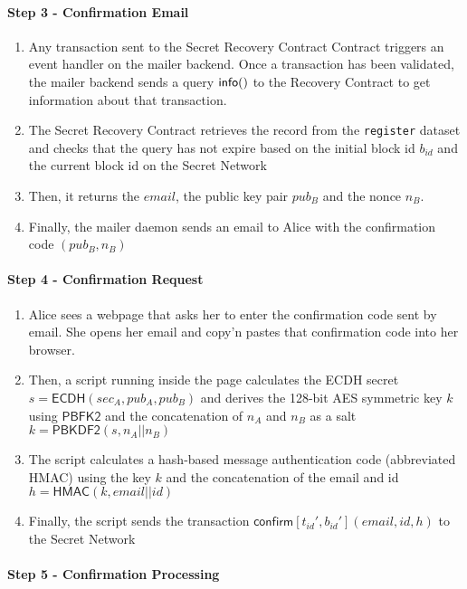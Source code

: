 \documentclass[12pt]{article}
\newcommand{\ms}[1]{\ensuremath{\mathsf{#1}}}
\newcommand{\tx}[3]{\ms{#1}[#2](#3)}
\newcommand{\qry}[3]{\ms{#1}(#3)}
\begin{document}
\paragraph{Step 3 - Confirmation Email}

\begin{enumerate}[label=3.\arabic*]
  \item Any transaction sent to the Secret Recovery Contract Contract triggers an event handler on the mailer backend. Once a transaction has been validated, the mailer backend sends a query $\qry{info}{t_id}$ to the Recovery Contract to get information about that transaction.
  \item The Secret Recovery Contract retrieves the record from the {\tt register} dataset and checks that the query has not expire based on the initial block id $b_{id}$ and the current block id on the Secret Network
  \item Then, it returns the $email$, the public key pair $pub_B$ and the nonce $n_B$.
  \item Finally, the mailer daemon sends an email to Alice with the confirmation code $(pub_B, n_B)$
\end{enumerate}

\paragraph{Step 4 - Confirmation Request}

\begin{enumerate}[label=4.\arabic*]
  \item Alice sees a webpage that asks her to enter the confirmation code sent by email. She opens her email and copy'n pastes that confirmation code into her browser. 
  \item Then, a script running inside the page calculates the ECDH secret $s=\ms{ECDH}(sec_A, pub_A, pub_B)$ and derives the 128-bit AES symmetric key $k$ using $\ms{PBFK2}$ and the concatenation of $n_A$ and $n_B$ as a salt $k=\ms{PBKDF2}(s, n_A || n_B)$
  \item The script calculates a hash-based message authentication code (abbreviated HMAC) using the key $k$ and the concatenation of the email and id $h=\ms{HMAC}(k, email || id)$
  \item Finally, the script sends the transaction $\tx{confirm}{t_{id}', b_{id}'}{email, id, h}$ to the Secret Network
\end{enumerate}

\paragraph{Step 5 - Confirmation Processing}
\end{document}
